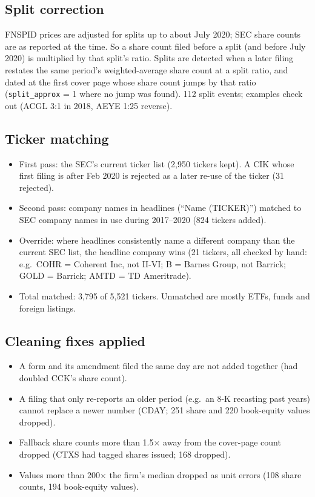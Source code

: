 \documentclass[11pt]{article}
\newcommand{\var}[1]{\texttt{#1}}
\begin{document}
\subsection{Split correction}
FNSPID prices are adjusted for splits up to about July 2020; SEC share counts are as reported at the time. So a share count filed before a split (and before July 2020) is multiplied by that split's ratio. Splits are detected when a later filing restates the same period's weighted-average share count at a split ratio, and dated at the first cover page whose share count jumps by that ratio (\var{split\_approx} = 1 where no jump was found). 112 split events; examples check out (ACGL 3:1 in 2018, AEYE 1:25 reverse).

\subsection{Ticker matching}
\begin{itemize}
  \item First pass: the SEC's current ticker list (2,950 tickers kept). A CIK whose first filing is after Feb 2020 is rejected as a later re-use of the ticker (31 rejected).
  \item Second pass: company names in headlines (``Name (TICKER)'') matched to SEC company names in use during 2017--2020 (824 tickers added).
  \item Override: where headlines consistently name a different company than the current SEC list, the headline company wins (21 tickers, all checked by hand: e.g.\ COHR = Coherent Inc, not II-VI; B = Barnes Group, not Barrick; GOLD = Barrick; AMTD = TD Ameritrade).
  \item Total matched: 3,795 of 5,521 tickers. Unmatched are mostly ETFs, funds and foreign listings.
\end{itemize}

\subsection{Cleaning fixes applied}
\begin{itemize}
  \item A form and its amendment filed the same day are not added together (had doubled CCK's share count).
  \item A filing that only re-reports an older period (e.g.\ an 8-K recasting past years) cannot replace a newer number (CDAY; 251 share and 220 book-equity values dropped).
  \item Fallback share counts more than 1.5$\times$ away from the cover-page count dropped (CTXS had tagged shares issued; 168 dropped).
  \item Values more than 200$\times$ the firm's median dropped as unit errors (108 share counts, 194 book-equity values).
\end{itemize}
\end{document}
